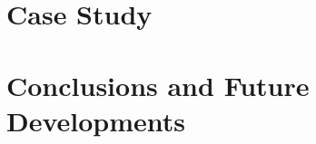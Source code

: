 \documentclass{article}
\begin{document}
%
%
%
%
%
%
%
%
%        
%    
%
%
%
%
%
%
%
%
%    
%
%
%

\section{Case Study}\label{sec:james_score}



\section{Conclusions and Future Developments}
\end{document}
